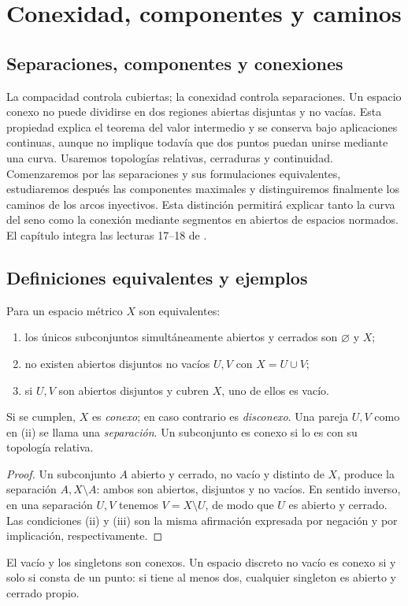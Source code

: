 \chapter{Conexidad, componentes y caminos}\label{cap:nuevo06}\label{chap:17}\label{chap:18}

\section{Separaciones, componentes y conexiones}\label{lectura:17}
La compacidad controla cubiertas; la conexidad controla separaciones. Un espacio conexo no puede dividirse en dos regiones abiertas disjuntas y no vacías. Esta propiedad explica el teorema del valor intermedio y se conserva bajo aplicaciones continuas, aunque no implique todavía que dos puntos puedan unirse mediante una curva. Usaremos topologías relativas, cerraduras y continuidad. Comenzaremos por las separaciones y sus formulaciones equivalentes, estudiaremos después las componentes maximales y distinguiremos finalmente los caminos de los arcos inyectivos. Esta distinción permitirá explicar tanto la curva del seno como la conexión mediante segmentos en abiertos de espacios normados. El capítulo integra las lecturas 17--18 de \cite{valencia}.

\section{Definiciones equivalentes y ejemplos}
\begin{proposicion}\label{ch17:def}
Para un espacio métrico $X$ son equivalentes:
\begin{enumerate}[label=(\roman*)]
\item los únicos subconjuntos simultáneamente abiertos y cerrados son $\varnothing$ y $X$;
\item no existen abiertos disjuntos no vacíos $U,V$ con $X=U\cup V$;
\item si $U,V$ son abiertos disjuntos y cubren $X$, uno de ellos es vacío.
\end{enumerate}
Si se cumplen, $X$ es \emph{conexo}; en caso contrario es \emph{disconexo}. Una pareja $U,V$ como en (ii) se llama una \emph{separación}. Un subconjunto es conexo si lo es con su topología relativa.
\end{proposicion}
\begin{proof}
Un subconjunto $A$ abierto y cerrado, no vacío y distinto de $X$, produce la separación $A,X\setminus A$: ambos son abiertos, disjuntos y no vacíos. En sentido inverso, en una separación $U,V$ tenemos $V=X\setminus U$, de modo que $U$ es abierto y cerrado. Las condiciones (ii) y (iii) son la misma afirmación expresada por negación y por implicación, respectivamente.
\end{proof}
El vacío y los singletons son conexos. Un espacio discreto no vacío es conexo si y solo si consta de un punto: si tiene al menos dos, cualquier singleton es abierto y cerrado propio.

